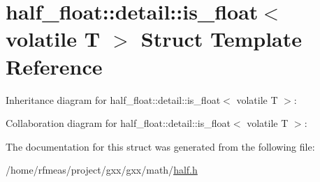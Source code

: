 \hypertarget{structhalf__float_1_1detail_1_1is__float_3_01volatile_01T_01_4}{}\section{half\+\_\+float\+:\+:detail\+:\+:is\+\_\+float$<$ volatile T $>$ Struct Template Reference}
\label{structhalf__float_1_1detail_1_1is__float_3_01volatile_01T_01_4}


Inheritance diagram for half\+\_\+float\+:\+:detail\+:\+:is\+\_\+float$<$ volatile T $>$\+:


Collaboration diagram for half\+\_\+float\+:\+:detail\+:\+:is\+\_\+float$<$ volatile T $>$\+:


The documentation for this struct was generated from the following file\+:\begin{DoxyCompactItemize}
\item 
/home/rfmeas/project/gxx/gxx/math/\hyperlink{half_8h}{half.\+h}\end{DoxyCompactItemize}
